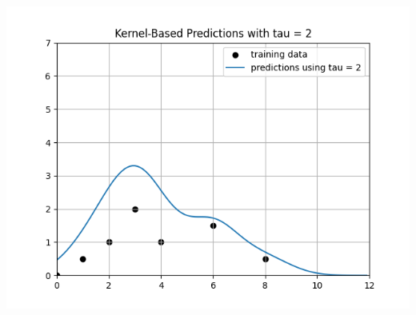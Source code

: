\documentclass[submit]{harvardml}
\begin{document}
\includegraphics[scale=0.75]{tau2.png} \\
\end{document}
